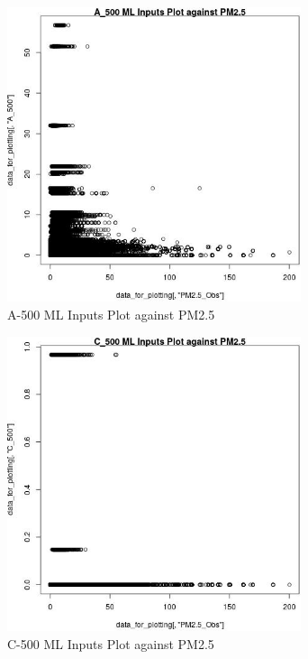 \begin{figure} 
\centering  
\includegraphics[width=0.77\textwidth]{Code_Outputs/ML_input_report_ML_input_PM25_Step5_part_d_de_duplicated_aves_ML_input_A_500vPM25_Obs.jpg} 
\caption{\label{fig:ML_input_report_ML_input_PM25_Step5_part_d_de_duplicated_aves_ML_inputA_500vPM25_Obs}A-500 ML Inputs Plot against PM2.5} 
\end{figure} 
 

\begin{figure} 
\centering  
\includegraphics[width=0.77\textwidth]{Code_Outputs/ML_input_report_ML_input_PM25_Step5_part_d_de_duplicated_aves_ML_input_C_500vPM25_Obs.jpg} 
\caption{\label{fig:ML_input_report_ML_input_PM25_Step5_part_d_de_duplicated_aves_ML_inputC_500vPM25_Obs}C-500 ML Inputs Plot against PM2.5} 
\end{figure} 
 

